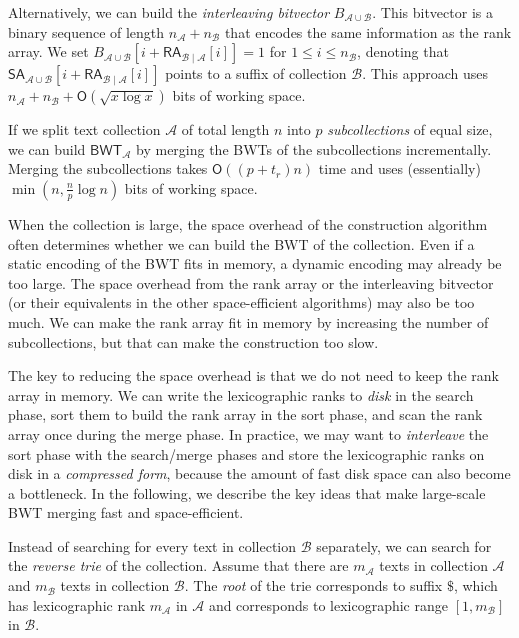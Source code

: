 \documentclass[smallabstract,smallcaptions]{dccpaper}
\newcommand{\Oh}{\ensuremath{\mathsf{O}}}
\newcommand{\BWT}{\textsf{BWT}}
\newcommand{\mSA}{\ensuremath{\mathsf{SA}}}
\newcommand{\mBWT}{\ensuremath{\mathsf{BWT}}}
\newcommand{\mRA}{\ensuremath{\mathsf{RA}}}
\newcommand{\Acoll}{\ensuremath{\mathcal{A}}}
\newcommand{\Bcoll}{\ensuremath{\mathcal{B}}}
\begin{document}
Alternatively, we can build the \emph{interleaving bitvector} $B_{\Acoll \cup \Bcoll}$. This bitvector is a binary sequence of length $n_{\Acoll} + n_{\Bcoll}$ that encodes the same information as the rank array. We set $B_{\Acoll \cup \Bcoll}[i + \mRA_{\Bcoll \mid \Acoll}[i]] = 1$ for $1 \le i \le n_{\Bcoll}$, denoting that $\mSA_{\Acoll \cup \Bcoll}[i + \mRA_{\Bcoll \mid \Acoll}[i]]$ points to a suffix of collection $\Bcoll$. This approach uses $n_{\Acoll} + n_{\Bcoll} + \Oh(\sqrt{x \log x})$ bits of working space.


\Section{Large-scale \BWT{} merging}

If we split text collection $\Acoll$ of total length $n$ into $p$ \emph{subcollections} of equal size, we can build $\mBWT_{\Acoll}$ by merging the \BWT{}s of the subcollections incrementally. Merging the subcollections takes $\Oh((p+t_{r})n)$ time and uses (essentially) $\min(n, \frac{n}{p} \log n)$ bits of working space.

When the collection is large, the space overhead of the construction algorithm often determines whether we can build the \BWT{} of the collection. Even if a static encoding of the \BWT{} fits in memory, a dynamic encoding may already be too large. The space overhead from the rank array or the interleaving bitvector (or their equivalents in the other space-efficient algorithms) may also be too much. We can make the rank array fit in memory by increasing the number of subcollections, but that can make the construction too slow.

The key to reducing the space overhead is that we do not need to keep the rank array in memory. We can write the lexicographic ranks to \emph{disk} in the search phase, sort them to build the rank array in the sort phase, and scan the rank array once during the merge phase. In practice, we may want to \emph{interleave} the sort phase with the search/merge phases and store the lexicographic ranks on disk in a \emph{compressed form}, because the amount of fast disk space can also become a bottleneck. In the following, we describe the key ideas that make large-scale \BWT{} merging fast and space-efficient.


Instead of searching for every text in collection $\Bcoll$ separately, we can search for the \emph{reverse trie} of the collection. Assume that there are $m_{\Acoll}$ texts in collection $\Acoll$ and $m_{\Bcoll}$ texts in collection $\Bcoll$. The \emph{root} of the trie corresponds to suffix $\$$, which has lexicographic rank $m_{\Acoll}$ in $\Acoll$ and corresponds to lexicographic range $[1,m_{\Bcoll}]$ in $\Bcoll$.
\end{document}
